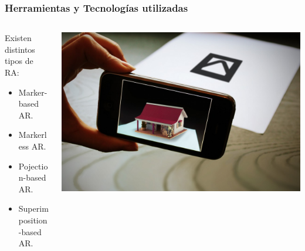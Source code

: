 \begin{frame}
	\frametitle{Herramientas y Tecnologías utilizadas}
	\begin{columns}
			\begin{column}{0.6\textwidth}
					Existen distintos tipos de RA:
					\begin{itemize}
						\item {Marker-based AR.}
						\item {Markerless AR.}
						\item {Pojection-based AR.}
						\item {Superimposition-based AR.}
					\end{itemize}
				\endblock{}
			\end{column}
			\begin{column}{0.4\textwidth}
				\vfill 
					\begin{center}
						\includegraphics[width=0.95\linewidth]{Images/marker-ar}
					\end{center}
			\end{column}
	\end{columns}
\end{frame}


